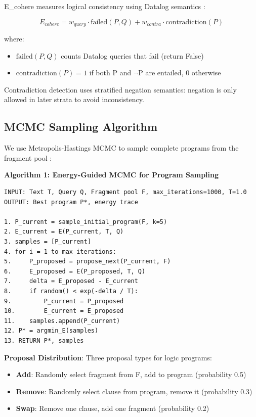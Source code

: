 \documentclass[11pt,letterpaper]{article}
\begin{document}
E\_cohere measures logical consistency using Datalog semantics \cite{Ceri1989}:

$$E_{cohere} = w_{query} \cdot \text{failed}(P, Q) + w_{contra} \cdot \text{contradiction}(P)$$

where:
\begin{itemize}
  \item $\text{failed}(P, Q)$ counts Datalog queries that fail (return False)
  \item $\text{contradiction}(P) = 1$ if both P and $\neg$P are entailed, 0 otherwise
\end{itemize}

Contradiction detection uses stratified negation semantics: negation is only allowed in later strata to avoid inconsistency.

\subsection{MCMC Sampling Algorithm}

We use Metropolis-Hastings MCMC to sample complete programs from the fragment pool \cite{Hastings1970}:

\textbf{Algorithm 1: Energy-Guided MCMC for Program Sampling}
\begin{lstlisting}
INPUT: Text T, Query Q, Fragment pool F, max_iterations=1000, T=1.0
OUTPUT: Best program P*, energy trace

1. P_current = sample_initial_program(F, k=5)
2. E_current = E(P_current, T, Q)
3. samples = [P_current]
4. for i = 1 to max_iterations:
5.     P_proposed = propose_next(P_current, F)
6.     E_proposed = E(P_proposed, T, Q)
7.     delta = E_proposed - E_current
8.     if random() < exp(-delta / T):
9.         P_current = P_proposed
10.        E_current = E_proposed
11.    samples.append(P_current)
12. P* = argmin_E(samples)
13. RETURN P*, samples
\end{lstlisting}

\textbf{Proposal Distribution}: Three proposal types for logic programs:
\begin{itemize}
  \item \textbf{Add}: Randomly select fragment from F, add to program (probability 0.5)
  \item \textbf{Remove}: Randomly select clause from program, remove it (probability 0.3)
  \item \textbf{Swap}: Remove one clause, add one fragment (probability 0.2)
\end{itemize}
\end{document}
